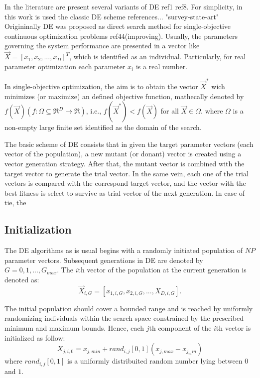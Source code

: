 In the literature are present several variants of DE ref1 ref8.
%
For simplicity, in this work is used the classic DE scheme references... "survey-state-art"
%
Origininally DE was proposed as direct search method for single-objective continuous optimization problems ref44(improving).
%
Usually, the parameters governing the system performance are presented in a vector like $\vec{X} = [x_1, x_2, ..., x_D ]^T$, which is identified as an individual.
%
Particularly, for real parameter optimization each parameter $x_i$ is a real number.
%

In single-objective optimization, the aim is to obtain the vector $\vec{X}^*$ wich minimizes (or maximize) an defined objective function, mathecally denoted by $f(\vec{X})(f : \Omega \subseteq \Re^D \rightarrow \Re)$, i.e., $f(\vec{X}^*) < f(\vec{X})$ for all $\vec{X} \in \Omega$. where $\Omega$ is a non-empty large finite set identified as the domain of the search.
%

The basic scheme of DE consists that in given the target parameter vectors (each vector of the population), a new mutant (or donant) vector is created using a vector generation strategy.
%
After that, the mutant vector is combined with the target vector to generate the trial vector.
%
In the same vein, each one of the trial vectors is compared with the correspond target vector, and the vector with the best fitness is select to survive as trial vector of the next generation.
%
In case of tie, the 

\subsection{Initialization}


The DE algorithms as is usual begins with a randomly initiated population of $NP$ parameter vectors.
%
Subsequent generations in DE are denoted by $G= 0,1, ..., G_{max}$.
%
The $i$th vector of the population at the current generation is denoted as:
\begin{equation}
\vec{X}_{i,G} = [x_{1,i,G}, x_{2,i,G},..., X_{D,i, G}].
\end{equation}
%

The initial population should cover a bounded range and is reached by uniformly randomizing individuals within the search space constrained by the prescribed minimum and maximum bounds.
%
Hence, each $j$th component of the $i$th vector is initialized as follow:
\begin{equation}
X_{j,i,0} = x_{j,min} + rand_{i,j}[0,1] (x_{j,max} - x_{j_min})
\end{equation}
where $rand_{i,j}[0,1]$ is a uniformly distribuited random number lying between $0$ and $1$.

